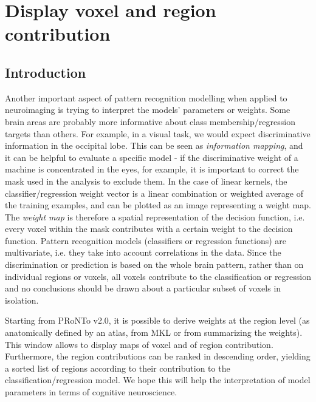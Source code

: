 %


\chapter{Display voxel and region contribution}
\label{chap:DisWeights}
\minitoc

\section{Introduction}

Another important aspect of pattern recognition modelling when applied to neuroimaging is trying to interpret the models' parameters or weights. Some brain 
areas are probably more informative about class membership/regression targets than others. For example, in a visual
task, we would expect discriminative information in the occipital lobe. This can be seen as \textit{information mapping}, and it can be helpful to evaluate a specific model - if
the discriminative weight of a machine is concentrated in the eyes, for example, it is important
to correct the mask used in the analysis to exclude them. In the case of linear kernels, the classifier/regression weight
vector is a linear combination or weighted average of the training examples, and can be plotted
as an image representing a weight map. The \textit{weight map} is therefore a spatial representation
of the decision function, i.e. every voxel within the mask contributes with a certain weight to the decision function. 
Pattern recognition models (classifiers or regression functions) are multivariate, i.e. they
take into account correlations in the data. Since the discrimination or prediction is
based on the whole brain pattern, rather than on individual regions or voxels, all voxels
contribute to the classification or regression and no conclusions should be drawn about a particular
subset of voxels in isolation.

Starting from PRoNTo v2.0, it is possible to derive weights at the region level (as anatomically defined by an atlas, from MKL or from summarizing the weights). This window allows to display maps of voxel and of region contribution. Furthermore, the region contributions can be ranked in descending order, yielding a sorted list of regions according to their contribution to the classification/regression model. We hope this will help the interpretation of model parameters in terms of cognitive neuroscience.

